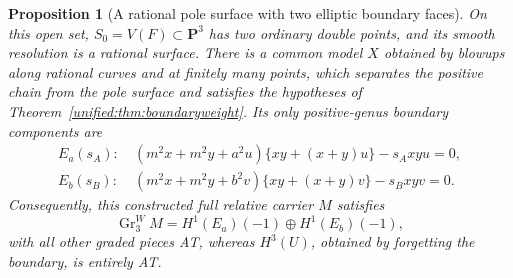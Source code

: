 \documentclass[11pt,a4paper,oneside]{article}
\theoremstyle{plain}
\newtheorem{proposition}[theorem]{Proposition}
\theoremstyle{definition}
\theoremstyle{remark}
\numberwithin{equation}{section}
\begin{document}
\begin{proposition}[A rational pole surface with two elliptic boundary faces]\label{unified:prop:injectedgeometry}
On this open set, $S_0=V(F)\subset\mathbf P^3$ has two ordinary double points,
and its smooth resolution is a rational surface. There is a common model $X$ obtained by blowups along rational curves and at finitely many points,
which separates the positive chain from the pole surface and satisfies the hypotheses of Theorem~\ref{unified:thm:boundaryweight}.
Its only positive-genus boundary components are
\begin{align}
 E_a(s_A):\ &(m^2x+m^2y+a^2u)\{xy+(x+y)u\}-s_Axyu=0,\\
 E_b(s_B):\ &(m^2x+m^2y+b^2v)\{xy+(x+y)v\}-s_Bxyv=0.
 \label{unified:eq:twofaceelliptics}
\end{align}
Consequently, this constructed full relative carrier $M$ satisfies
\begin{equation}\label{unified:eq:injectedcarrier}
 \operatorname{Gr}^W_3 M=H^1(E_a)(-1)\oplus H^1(E_b)(-1),
\end{equation}
with all other graded pieces AT, whereas $H^3(U)$, obtained by forgetting the boundary, is entirely AT.
\end{proposition}
\end{document}
